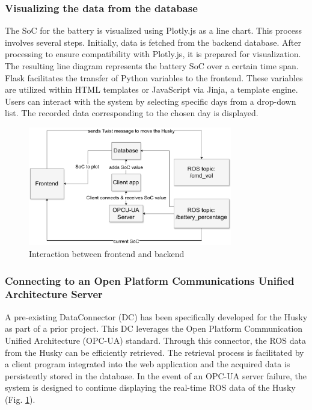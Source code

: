 \documentclass[conference]{IEEEtran}
\begin{document}
\subsubsection{Visualizing the data from the database}
The SoC for the battery is visualized using Plotly.js as a line chart. This process involves several steps. Initially, data is fetched from the backend database. After processing to ensure compatibility with Plotly.js, it is prepared for visualization. The resulting line diagram represents the battery SoC over a certain time span. Flask facilitates the transfer of Python variables to the frontend. 
These variables are utilized within HTML templates or JavaScript via Jinja, a template engine. Users can interact with the system by selecting specific days from a drop-down list. The recorded data corresponding to the chosen day is displayed.
\begin{figure}[tp]
    \centerline{\includegraphics[width=8.9cm]{Pictures/backfrontbig.pdf}}
    \caption{Interaction between frontend and backend}
    \label{fig:backfront}
\end{figure}
\subsubsection{Connecting to an Open Platform Communications Unified Architecture Server}
A pre-existing DataConnector (DC) has been specifically developed for the Husky as part of a prior project. This DC leverages the Open Platform Communication Unified Architecture \cite{opcua} (OPC-UA) standard. Through this connector, the ROS data from the Husky can be efficiently retrieved. The retrieval process is facilitated by a client program integrated into the web application and the acquired data is persistently stored in the database. 
In the event of an OPC-UA server failure, the system is designed to continue displaying the real-time ROS data of the Husky (Fig. \ref{fig:backfront}).
\end{document}

